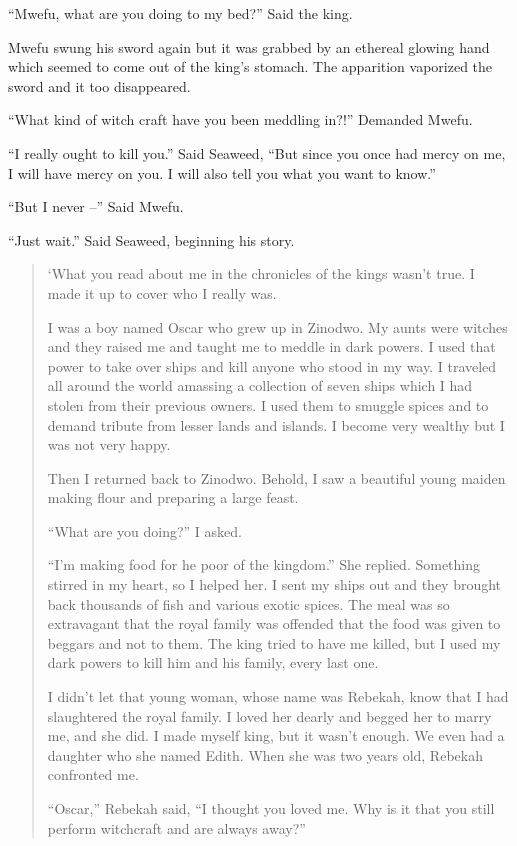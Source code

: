 ``Mwefu, what are you doing to my bed?'' Said the king.

Mwefu swung his sword again but it was grabbed by an ethereal glowing hand which seemed to come out of the king's stomach. The apparition vaporized the sword and it too disappeared.

``What kind of witch craft have you been meddling in?!'' Demanded Mwefu.

``I really ought to kill you.'' Said Seaweed, ``But since you once had mercy on me, I will have mercy on you. I will also tell you what you want to know.''

``But I never --'' Said Mwefu.

``Just wait.'' Said Seaweed, beginning his story.

\begin{quote}
`What you read about me in the chronicles of the kings wasn't true. I made it up to cover who I really was.

I was a boy named Oscar who grew up in Zinodwo.
My aunts were witches and they raised me and taught me to meddle in dark powers.
I used that power to take over ships and kill anyone who stood in my way.
I traveled all around the world amassing a collection of seven ships which I had stolen from their previous owners.
I used them to smuggle spices and to demand tribute from lesser lands and islands.
I become very wealthy but I was not very happy.

Then I returned back to Zinodwo.
Behold, I saw a beautiful young maiden making flour and preparing a large feast.

``What are you doing?'' I asked.

``I'm making food for he poor of the kingdom.'' She replied.
Something stirred in my heart, so I helped her.
I sent my ships out and they brought back thousands of fish and various exotic spices.
The meal was so extravagant that the royal family was offended that the food was given to beggars and not to them.
The king tried to have me killed, but I used my dark powers to kill him and his family, every last one.

I didn't let that young woman, whose name was Rebekah, know that I had slaughtered the royal family.
I loved her dearly and begged her to marry me, and she did.
I made myself king, but it wasn't enough.
We even had a daughter who she named Edith. When she was two years old, Rebekah confronted me.

``Oscar,'' Rebekah said, ``I thought you loved me.
Why is it that you still perform witchcraft and are always away?''


\end{quote}
